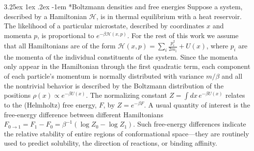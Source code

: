 \documentclass[%
onecolumn,
superscriptaddress,
nofootinbib,
amsmath,amssymb,
table
]{revtex4-2}
\makeatletter
\renewcommand\paragraph{%
  \@startsection{paragraph}{4}{\z@}%
    {3.25ex \@plus1ex \@minus.2ex}%
    {-1em}%
    {\normalfont\normalsize\bfseries}%
}
\makeatother
\begin{document}
\paragraph*{Boltzmann densities and free energies}
Suppose a system, described by a Hamiltonian $\mathcal H$, is in thermal equilibrium with a heat reservoir. The likelihood of a particular microstate, described by coordinates $x$ and momenta $p$, is proportional to $e^{-\beta \mathcal H(x,p)}$. For the rest of this work we assume that all Hamiltonians are of the form $\mathcal H(x,p)=\sum_i \frac{p_i^2}{2m_i} + U(x)$, where $p_i$ are the momenta of the individual constituents of the system. Since the momenta only appear in the Hamiltonian through the first quadratic term, each component of each particle's momentum is normally distributed with variance $m/\beta$ and all the nontrivial behavior is described by the Boltzmann distribution of the positions $\rho(x) \propto e^{-\beta U(x)}$. The normalizing constant $Z=\int dx\,e^{-\beta U(x)}$ relates to the (Helmholtz) free energy, $F$, by $Z=e^{-\beta F}$. A usual quantity of interest is the free-energy difference between different Hamiltonians $F_{0\rightarrow 1} = F_1 -F_0 = \beta^{-1}(\log Z_0 -\log Z_1)$. Such free-energy differences indicate the relative stability of entire regions of conformational space---they are routinely used to predict solubility, the direction of reactions, or binding affinity.
\end{document}
